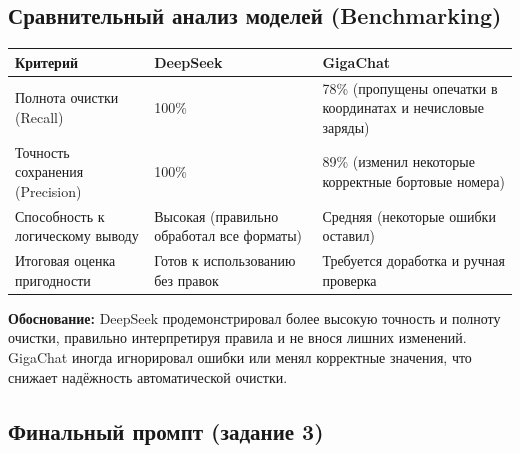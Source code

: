 \documentclass[oneside,a4paper,14pt]{extarticle} %
\begin{document}
	\subsection{Сравнительный анализ моделей (Benchmarking)}
	\noindent
	\begin{table}[H]
		\centering
		\begin{tabular}{|p{4cm}|p{6cm}|p{6cm}|}
			\hline
			\textbf{Критерий} & \textbf{DeepSeek} & \textbf{GigaChat} \\ \hline
			Полнота очистки (Recall) & 100\% & 78\% (пропущены опечатки в координатах и нечисловые заряды) \\ \hline
			Точность сохранения (Precision) & 100\% & 89\% (изменил некоторые корректные бортовые номера) \\ \hline
			Способность к логическому выводу & Высокая (правильно обработал все форматы) & Средняя (некоторые ошибки оставил) \\ \hline
			Итоговая оценка пригодности & Готов к использованию без правок & Требуется доработка и ручная проверка \\ \hline
		\end{tabular}
	\end{table}
	\noindent
	\textbf{Обоснование:} DeepSeek продемонстрировал более высокую точность и полноту очистки, правильно интерпретируя правила и не внося лишних изменений. GigaChat иногда игнорировал ошибки или менял корректные значения, что снижает надёжность автоматической очистки.
	\subsection{Финальный промпт (задание 3)}
	
	\newpage
\end{document}
